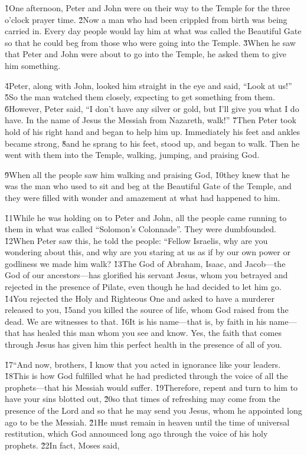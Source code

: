 \v{1}One afternoon, Peter and John were on their way to the Temple for the three o'clock prayer time. \v{2}Now a man who had been crippled from birth was being carried in. Every day people would lay him at what was called the Beautiful Gate so that he could beg from those who were going into the Temple. \v{3}When he saw that Peter and John were about to go into the Temple, he asked them to give him something.

\v{4}Peter, along with John, looked him straight in the eye and said, ``Look at us!'' \v{5}So the man watched them closely, expecting to get something from them. \v{6}However, Peter said, ``I don't have any silver or gold, but I'll give you what I do have. In the name of Jesus the Messiah from Nazareth, walk!'' \v{7}Then Peter took hold of his right hand and began to help him up. Immediately his feet and ankles became strong, \v{8}and he sprang to his feet, stood up, and began to walk. Then he went with them into the Temple, walking, jumping, and praising God.

\v{9}When all the people saw him walking and praising God, \v{10}they knew that he was the man who used to sit and beg at the Beautiful Gate of the Temple, and they were filled with wonder and amazement at what had happened to him.

\v{11}While he was holding on to Peter and John, all the people came running to them in what was called ``Solomon's Colonnade''. They were dumbfounded. \v{12}When Peter saw this, he told the people: ``Fellow Israelis, why are you wondering about this, and why are you staring at us as if by our own power or godliness we made him walk? \v{13}The God of Abraham, Isaac, and Jacob---the God of our ancestors---has glorified his servant Jesus, whom you betrayed and rejected in the presence of Pilate, even though he had decided to let him go. \v{14}You rejected the Holy and Righteous One and asked to have a murderer released to you, \v{15}and you killed the source of life, whom God raised from the dead. We are witnesses to that. \v{16}It is his name---that is, by faith in his name---that has healed this man whom you see and know. Yes, the faith that comes through Jesus has given him this perfect health in the presence of all of you.

\v{17}``And now, brothers, I know that you acted in ignorance like your leaders. \v{18}This is how God fulfilled what he had predicted through the voice of all the prophets---that his Messiah would suffer. \v{19}Therefore, repent and turn to him to have your sins blotted out, \v{20}so that times of refreshing may come from the presence of the Lord and so that he may send you Jesus, whom he appointed long ago to be the Messiah. \v{21}He must remain in heaven until the time of universal restitution, which God announced long ago through the voice of his holy prophets. \v{22}In fact, Moses said,

